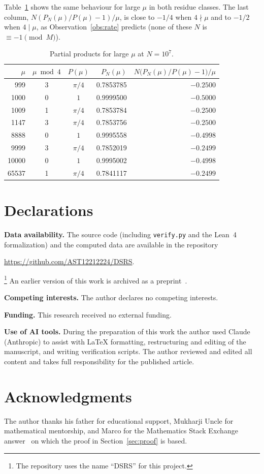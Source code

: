 \documentclass{amsart}
\theoremstyle{definition}
\theoremstyle{remark}
\begin{document}
Table~\ref{tab:large} shows the same behaviour for large $\mu$ in both residue classes. The last column, $N(P_N(\mu)/P(\mu)-1)/\mu$, is close to $-1/4$ when $4\nmid\mu$ and to $-1/2$ when $4\mid\mu$, as Observation~\ref{obs:rate} predicts (none of these $N$ is $\equiv-1\pmod M$).

\begin{table}[ht]
\centering
\caption{Partial products for large $\mu$ at $N=10^7$.}
\label{tab:large}
\begin{tabular}{rccrr}
\toprule
$\mu$ & $\mu \bmod 4$ & $P(\mu)$ & $P_N(\mu)$ & $N\bigl(P_N(\mu)/P(\mu)-1\bigr)/\mu$\\
\midrule
999   & 3 & $\pi/4$ & 0.7853785 & $-0.2500$\\
1000  & 0 & $1$     & 0.9999500 & $-0.5000$\\
1009  & 1 & $\pi/4$ & 0.7853784 & $-0.2500$\\
1147  & 3 & $\pi/4$ & 0.7853756 & $-0.2500$\\
8888  & 0 & $1$     & 0.9995558 & $-0.4998$\\
9999  & 3 & $\pi/4$ & 0.7852019 & $-0.2499$\\
10000 & 0 & $1$     & 0.9995002 & $-0.4998$\\
65537 & 1 & $\pi/4$ & 0.7841117 & $-0.2499$\\
\bottomrule
\end{tabular}
\end{table}

\section*{Declarations}

\textbf{Data availability.} The source code (including \texttt{verify.py} and the Lean~4 formalization) and the computed data are available in the repository
\begin{center}\url{https://github.com/AST12212224/DSRS}.\end{center}\footnote{The repository uses the name ``DSRS'' for this project.} An earlier version of this work is archived as a preprint~\cite{tikhe2025zenodo}.

\textbf{Competing interests.} The author declares no competing interests.

\textbf{Funding.} This research received no external funding.

\textbf{Use of AI tools.} During the preparation of this work the author used Claude (Anthropic) to assist with LaTeX formatting, restructuring and editing of the manuscript, and writing verification scripts. The author reviewed and edited all content and takes full responsibility for the published article.

\section*{Acknowledgments}
The author thanks his father for educational support, Mukharji Uncle for mathematical mentorship, and Marco for the Mathematics Stack Exchange answer~\cite{marco2025} on which the proof in Section~\ref{sec:proof} is based.



\end{document}

